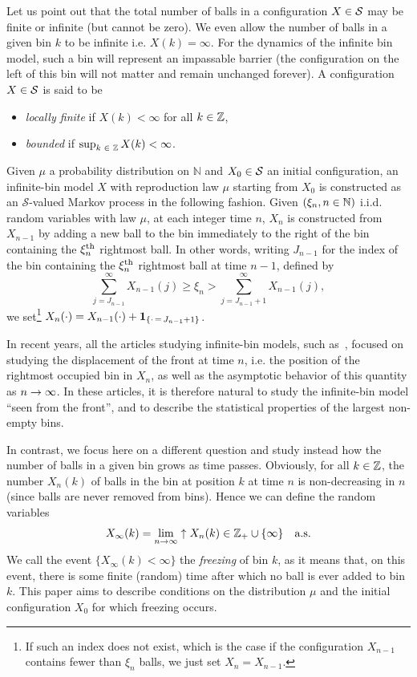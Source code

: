\documentclass[AHL,Unicode,longabstracts,published]{cedram}
\newcommand{\bbN}{\mathbb{N}}
\newcommand{\Z}{\mathbb{Z}}
\newcommand{\ind}[1]{\mathbf{1}_{\left\{#1\right\}}}
\renewcommand{\S}{\mathcal{S}}
\let\originalleft\left
\let\originalright\right
\renewcommand{\left}{\mathopen{}\mathclose\bgroup\originalleft}
\renewcommand{\right}{\aftergroup\egroup\originalright}
\let\oldin\in
\renewcommand{\in}{\mathchoice{\oldin}{\oldin}{\,\oldin\,}{\,\oldin\,}}
\renewcommand*{\to}{\mathchoice{\longrightarrow}{\rightarrow}{\rightarrow}{\rightarrow}}
\newcommand{\Z}{\mathbb{Z}}
\begin{document}
Let us point out that the total number of balls in a configuration $X \in \S$ may be finite or infinite (but cannot be zero). We even allow the number of balls in a given bin $k$ to be infinite i.e. $ X(k) = \infty$. For the dynamics of the infinite bin model, such a bin will represent an impassable barrier (the configuration on the left of this bin will not matter and remain unchanged forever). A configuration $X \in \S$ is said to be
\begin{itemize}
\item \emph{locally finite} if $X(k) < \infty$ for all $k\in \Z$,
\item \emph{bounded} if $\sup_{k\in \Z} X(k) < \infty$.
\end{itemize}

Given $\mu$ a probability distribution on $\bbN$ and $X_0 \in \S$ an initial configuration, an infinite-bin model $X$ with reproduction law $\mu$ starting from $X_0$ is constructed as an $\S$-valued Markov process in the following fashion. Given $(\xi_n, n \in \bbN)$ i.i.d. random variables with law $\mu$, at each integer time $n$, $X_n$ is constructed from $X_{n-1}$ by adding a new ball to the bin immediately to the right of the bin containing the $\xi_{n}^{\rm th}$ rightmost ball. In other words, writing $J_{n-1}$ for the index of the bin containing the $\xi_{n}^{\rm th}$ rightmost ball at time $n-1$, defined by
\[
\sum_{j = J_{n-1}}^\infty X_{n-1}(j) \geq \xi_{n} > \sum_{j=J_{n-1} +1}^\infty X_{n-1}(j),
\]
we set\footnote{If such an index does not exist, which is the case if the configuration $X_{n-1}$ contains fewer than $\xi_{n}$ balls, we just set $X_{n}=X_{n-1}$.} $X_{n}(\cdot) = X_{n-1}(\cdot) + \ind{\cdot\,=\,J_{n-1}+1}$.


In recent years, all the articles studying infinite-bin models, such as~\cite{CR,FK,FZ,MR17,MR16,Terlat}, focused on studying the displacement of the front at time $n$, i.e. the position of the rightmost occupied bin in $X_n$, as well as the asymptotic behavior of this quantity as $n \to \infty$. In these articles, it is therefore natural to study the infinite-bin model ``seen from the front'', and to describe the statistical properties of the largest non-empty bins.

In contrast, we focus here on a different question and study instead how the number of balls in a given bin grows as time passes. Obviously, for all $k \in \Z$, the number $X_n(k)$ of balls in the bin at position $k$ at time $n$ is non-decreasing in $n$ (since balls are never removed from bins). Hence we can define the random variables
\[
X_\infty(k) = \lim_{n \to \infty}\uparrow X_n(k) \in \Z_+ \cup \{\infty\} \quad \text{a.s.}
\]
We call the event $\{X_\infty(k) < \infty\}$ the \emph{freezing} of bin $k$, as it means that, on this event, there is some finite (random) time after which no ball is ever added to bin $k$. This paper aims to describe conditions on the distribution $\mu$ and the initial configuration $X_0$ for which freezing occurs.
\end{document}

